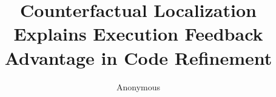 \documentclass[10pt]{article}
\title{Counterfactual Localization Explains Execution Feedback Advantage in Code Refinement}
\author{Anonymous}
\date{}
\begin{document}
\maketitle

\begin{abstract}

\end{abstract}











\end{document}
